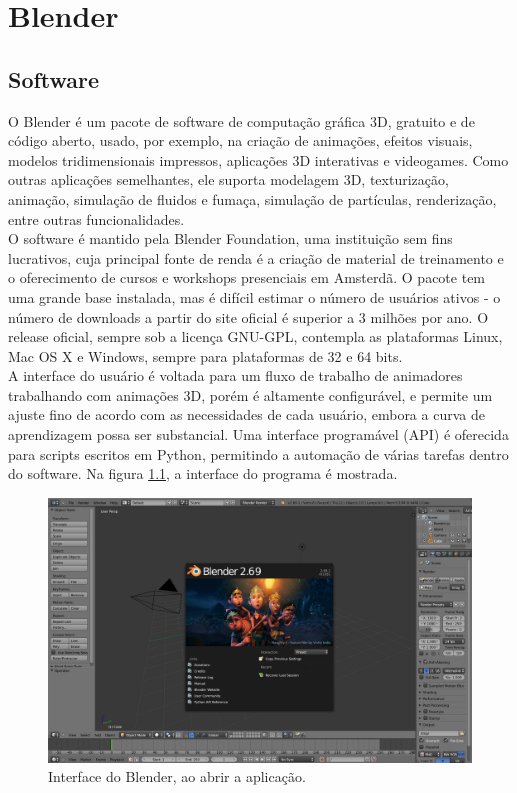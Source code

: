 \documentclass[12pt, a4paper, oneside]{book}
\begin{document}
%
%

\chapter{Blender}

\section{Software}
O Blender é um pacote de software de computação gráfica 3D, gratuito e de código aberto, usado, por exemplo, na criação de animações, efeitos visuais, modelos tridimensionais impressos, aplicações 3D interativas e videogames. Como outras aplicações semelhantes, ele suporta modelagem 3D, texturização, animação, simulação de fluidos e fumaça, simulação de partículas, renderização, entre outras funcionalidades. \\

O software é mantido pela Blender Foundation, uma instituição sem fins lucrativos, cuja principal fonte de renda é a criação de material de treinamento e o oferecimento de cursos e workshops presenciais em Amsterdã. O pacote tem uma grande base instalada, mas é difícil estimar o número de usuários ativos - o número de downloads a partir do site oficial é superior a 3 milhões por ano. O release oficial, sempre sob a licença GNU-GPL, contempla as plataformas Linux, Mac OS X e Windows, sempre para plataformas de 32 e 64 bits. \\

A interface do usuário é voltada para um fluxo de trabalho de animadores trabalhando com animações 3D, porém é altamente configurável, e permite um ajuste fino de acordo com as necessidades de cada usuário, embora a curva de aprendizagem possa ser substancial. Uma interface programável (API) é oferecida para scripts escritos em Python, permitindo a automação de várias tarefas dentro do software. Na figura \ref{blender_gui}, a interface do programa é mostrada. \\ 

\begin{figure}[!htb]
\center
\includegraphics[width=17cm]{blender_gui}
\caption{Interface do Blender, ao abrir a aplicação.}
\label{blender_gui}
\end{figure}
\end{document}
